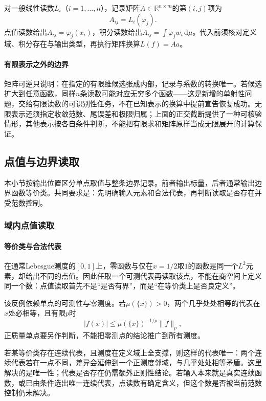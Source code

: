 对一般线性读数$L_i$（$i=1,\dots,n$），记录矩阵$A\in\mathbb R^{n\times m}$的第$(i,j)$项为
\[
A_{ij}=L_i(\varphi_j).
\]
点值读数给出$A_{ij}=\varphi_j(x_i)$，积分读数给出$A_{ij}=\int\varphi_j w_i\,\mathrm d\mu$。代入前须核对定义域、积分存在与输出类型，再执行矩阵换算$L(f)=Aa$。

\paragraph{有限表示之外的边界}

矩阵可逆只说明：在指定的有限维候选张成内部，记录与系数的转换唯一。若候选扩大到任意函数，同样$n$条读数可能对应无穷多个函数——这是新增的单射性问题，交给有限读数的可识别性任务，不在已知表示的换算中提前宣告恢复成功。无限表示还须指定收敛范数、尾误差和极限归属；上面的正交截断提供了一种可核验情形，其他表示按各自条件判断，不能把有限求和矩阵原样当成无限展开的计算保证。

\subsection{点值与边界读取}
\label{subsubsec:point-boundary-readouts}

本小节按输出位置区分单点取值与整条边界记录。前者输出标量，后者通常输出边界函数等价类。共同要求是：先明确输入元素和合法代表，再判断读取是否存在并受范数控制。

\subsubsection{域内点值读取}
\label{subsubsec:point-evaluation}

\paragraph{等价类与合法代表}

在通常Lebesgue测度的$[0,1]$上，零函数与仅在$x=1/2$取$1$的函数是同一个$L^2$元素，却给出不同的点值。因此任取一个可测代表再读取该点，不能在商空间上定义同一个数：点值读取首先不是“是否有界”，而是“在等价类上是否良定义”。

该反例依赖单点的可测性与零测度。若$\mu(\{x\})>0$，两个几乎处处相等的代表在$x$处必相等，且有限$p$时
\[
|f(x)|\le\mu(\{x\})^{-1/p}\|f\|_p,
\]
正质量单点要另作判断，不能把零测点的结论推广到所有测度。

若某等价类存在连续代表，且测度在定义域上全支撑，则这样的代表唯一：两个连续代表若在一点不同，差异会延伸到一个正测度邻域，与几乎处处相等矛盾。这里解决的是唯一性；代表是否存在仍需额外正则性结论。若输入本来就是真实连续函数，或已由条件选出唯一连续代表，点读数有确定含义，但这个数是否被当前范数控制仍未解决。

